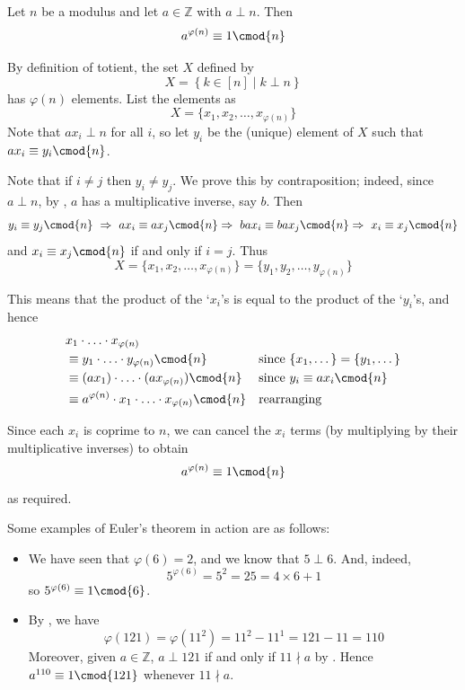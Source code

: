 \begin{theorem}
\label{thmEuler}
Let $n$ be a modulus and let $a \in \mathbb{Z}$ with $a \perp n$. Then
\[ a^{\varphi(n)} \equiv 1 \cmod{n} \]
\end{theorem}
\begin{cproof}
By definition of totient, the set $X$ defined by
\[ X = \left\{ k \in \left[n\right] \mid k \perp n \right\} \]
has $\varphi(n)$ elements. List the elements as
\[ X = \{ x_1, x_2, \dots, x_{\varphi(n)} \} \]
Note that $ax_i \perp n$ for all $i$, so let $y_i$ be the (unique) element of $X$ such that $ax_i \equiv y_i \cmod{n}$.

Note that if $i \ne j$ then $y_i \ne y_j$. We prove this by contraposition; indeed, since $a \perp n$, by , $a$ has a multiplicative inverse, say $b$. Then
\[ y_i \equiv y_j \cmod{n}\ \Rightarrow\ ax_i \equiv ax_j \cmod{n} \Rightarrow\ bax_i \equiv bax_j \cmod{n} \Rightarrow\ x_i \equiv x_j \cmod{n} \]
and $x_i \equiv x_j \cmod{n}$ if and only if $i=j$. Thus
\[ X = \{ x_1, x_2, \dots, x_{\varphi(n)} \} = \{ y_1, y_2, \dots, y_{\varphi(n)} \} \]

This means that the product of the `$x_i$'s is equal to the product of the `$y_i$'s, and hence
\begin{align*}
& x_1 \cdot {\dots} \cdot x_{\varphi(n)} &&
\\
&\equiv y_1 \cdot {\dots} \cdot y_{\varphi(n)} \cmod{n} && \text{since $\{ x_1, \dots \} = \{ y_1, \dots \}$} \\
&\equiv (ax_1) \cdot {\dots} \cdot (ax_{\varphi(n)}) \cmod{n} && \text{since $y_i \equiv ax_i \cmod{n}$}\\
&\equiv a^{\varphi(n)} \cdot x_1 \cdot {\dots} \cdot x_{\varphi(n)} \cmod{n} && \text{rearranging}
\end{align*}

Since each $x_i$ is coprime to $n$, we can cancel the $x_i$ terms (by multiplying by their multiplicative inverses) to obtain
\[ a^{\varphi(n)} \equiv 1 \cmod{n} \]
as required.
\end{cproof}

\begin{example}
Some examples of Euler's theorem in action are as follows:
\begin{itemize}
\item We have seen that $\varphi(6) = 2$, and we know that $5 \perp 6$. And, indeed,
\[ 5^{\varphi(6)} = 5^2 = 25 = 4 \times 6 + 1 \]
so $5^{\varphi(6)} \equiv 1 \cmod{6}$.
\item By , we have
\[ \varphi(121) = \varphi(11^2) = 11^2-11^1 = 121-11 = 110 \]
Moreover, given $a \in \mathbb{Z}$, $a \perp 121$ if and only if $11 \nmid a$ by . Hence $a^{110} \equiv 1 \cmod{121}$ whenever $11 \nmid a$.
\end{itemize}
\end{example}

